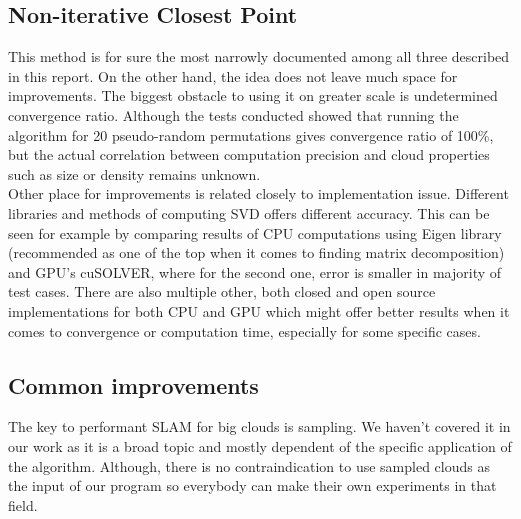 \documentclass[titlepage]{article}
\begin{document}
\subsection{Non-iterative Closest Point}
This method is for sure the most narrowly documented among all three described in this report. On the other hand, the idea does not leave much space for improvements. The biggest obstacle to using it on greater scale is undetermined convergence ratio. Although the tests conducted showed that running the algorithm for 20 pseudo-random permutations gives convergence ratio of 100\%, but the actual correlation between computation precision and cloud properties such as size or density remains unknown.\\
Other place for improvements is related closely to implementation issue. Different libraries and methods of computing SVD offers different accuracy. This can be seen for example by comparing results of CPU computations using Eigen library (recommended as one of the top when it comes to finding matrix decomposition) and GPU's cuSOLVER, where for the second one, error is smaller in majority of test cases. There are also multiple other, both closed and open source implementations for both CPU and GPU which might offer better results when it comes to convergence or computation time, especially for some specific cases.

\subsection{Common improvements}
The key to performant SLAM for big clouds is sampling. We haven't covered it in our work as it is a broad topic and mostly dependent of the specific application of the algorithm. Although, there is no contraindication to use sampled clouds as the input of our program so everybody can make their own experiments in that field.

\newpage
\printbibliography
\end{document}

